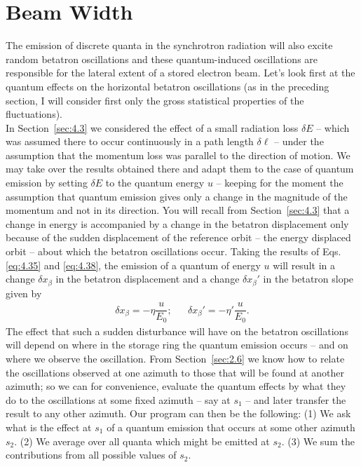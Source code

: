 \section{Beam Width} \label{sec:5.5}

The emission of discrete quanta in the synchrotron radiation will also excite random betatron oscillations and these quantum-induced oscillations are responsible for the lateral extent of a stored electron beam. Let's look first at the quantum effects on the horizontal betatron oscillations (as in the preceding section, I will consider first only the gross statistical
 properties of the fluctuations).\\
In Section~\ref{sec:4.3} we considered the effect of a small radiation loss $\delta E$ -- which
was assumed there to occur continuously in a path length $\delta \ell$ -- under the assumption that the momentum loss was parallel to the direction of motion. We may take over the results obtained there and adapt them to the case of quantum emission by setting $\delta E$ to the quantum
 energy $u$ -- keeping for the moment the assumption that quantum emission gives only a change in the magnitude of the momentum and not in its direction. You will recall from Section~\ref{sec:4.3} that a change in energy is accompanied by a change in the betatron displacement only because of the sudden displacement of the reference orbit -- the energy displaced orbit -- about which
the betatron oscillations occur. Taking the results of Eqs. \eqref{eq:4.35} and \eqref{eq:4.38},
 the emission of a quantum of energy $u$ will result in a change $\delta x_\beta$ in the betatron displacement and a change $\delta x_\beta'$ in the betatron slope given by
\begin{align}\label{eq:5.67}
	\delta x_\beta = -\eta \dfrac{u}{E_0}; && \delta x_\beta' = -\eta' \dfrac{u}{E_0}.
\end{align}
The effect that such a sudden disturbance will have on the betatron oscillations will depend on where in the storage ring the quantum emission occurs -- and on where we observe the oscillation.
 From Section~\ref{sec:2.6} we know how to relate the oscillations observed at one azimuth to those that will be found at another azimuth; so we can for convenience, evaluate the quantum effects by what they do to the oscillations at some fixed azimuth -- say at $s_1$ -- and later transfer the result to any other azimuth. Our program can then be the following: (1) We ask what is
the effect at $s_1$ of a quantum emission that occurs at some other azimuth $s_2$. (2) We average over all quanta which might be emitted at $s_2$. (3) We sum the contributions from all possible values of $s_2$.\\
